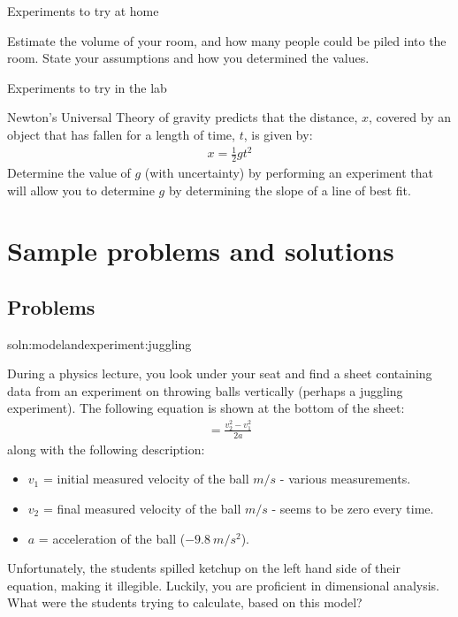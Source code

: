 \begin{chapteractivity}{Experiments to try at home}
{
\item Estimate the volume of your room, and how many people could be piled into the room. State your assumptions and how you determined the values.
}
\end{chapteractivity}

\begin{chapteractivity}{Experiments to try in the lab}
{
\item Newton's Universal Theory of gravity predicts that the distance, $x$, covered by an object that has fallen for a length of time, $t$, is given by:
\begin{align*}
x = \frac{1}{2}gt^2
\end{align*}
Determine the value of $g$ (with uncertainty) by performing an experiment that will allow you to determine $g$ by determining the slope of a line of best fit.
}
\end{chapteractivity}


\section{Sample problems and solutions}
\subsection{Problems}
\begin{problem}{soln:modelandexperiment:juggling}{\label{prob:modelandexperiment:juggling}During a physics lecture, you look under your seat and find a sheet containing data from an experiment on throwing balls vertically (perhaps a juggling experiment). The following equation is shown at the bottom of the sheet: 
\begin{align*}
=\frac{v_2^{2}-v_1^{2}}{2a}
\end{align*}
along with the following description: 
\begin{itemize}
\item $v_1$ = initial measured velocity of the ball $\si{m/s}$ - various measurements.
\item $v_2$ = final measured velocity of the ball $\si{m/s}$ - seems to be zero every time.
\item $a$ = acceleration of the ball ($\SI{-9.8}{m/s^2}$).
\end{itemize}
Unfortunately, the students spilled ketchup on the left hand side of their equation, making it illegible. Luckily, you are proficient in dimensional analysis. What were the students trying to calculate, based on this model?}
\end{problem}

